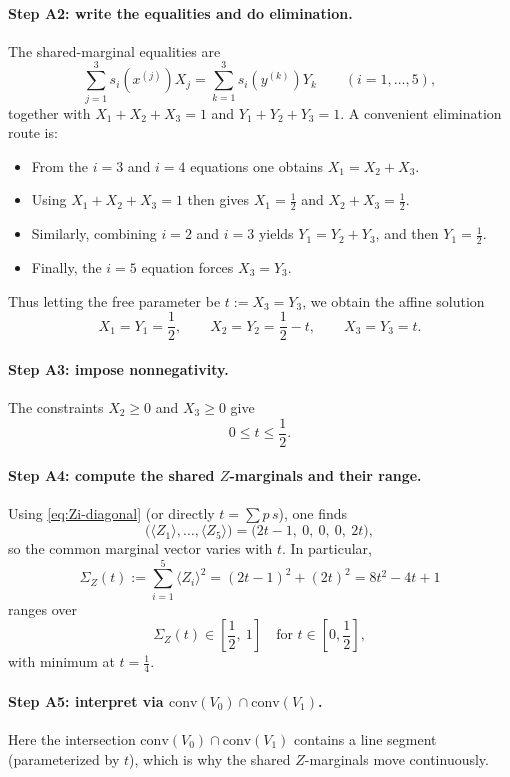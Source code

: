 \documentclass[11pt]{article}
\begin{document}
\paragraph{Step A2: write the equalities and do elimination.}
The shared-marginal equalities are
\[
\sum_{j=1}^3 s_i(x^{(j)})X_j=\sum_{k=1}^3 s_i(y^{(k)})Y_k\qquad (i=1,\dots,5),
\]
together with
\(
X_1+X_2+X_3=1
\) and
\(
Y_1+Y_2+Y_3=1.
\)
A convenient elimination route is:
\begin{itemize}
\item From the $i=3$ and $i=4$ equations one obtains $X_1=X_2+X_3$.
\item Using $X_1+X_2+X_3=1$ then gives $X_1=\tfrac12$ and $X_2+X_3=\tfrac12$.
\item Similarly, combining $i=2$ and $i=3$ yields $Y_1=Y_2+Y_3$, and then $Y_1=\tfrac12$.
\item Finally, the $i=5$ equation forces $X_3=Y_3$.
\end{itemize}
Thus letting the free parameter be
\(
 t:=X_3=Y_3
\), we obtain the affine solution
\[
X_1=Y_1=\frac12,\qquad X_2=Y_2=\frac12-t,\qquad X_3=Y_3=t.
\]

\paragraph{Step A3: impose nonnegativity.}
The constraints $X_2\ge 0$ and $X_3\ge 0$ give
\[
0\le t\le \frac12.
\]

\paragraph{Step A4: compute the shared $Z$-marginals and their range.}
Using \eqref{eq:Zi-diagonal} (or directly $t=\sum p\,s$), one finds
\[
\bigl(\langle Z_1\rangle,\dots,\langle Z_5\rangle\bigr)=\bigl(2t-1,\ 0,\ 0,\ 0,\ 2t\bigr),
\]
so the common marginal vector varies with $t$.
In particular,
\[
\Sigma_Z(t):=\sum_{i=1}^5\langle Z_i\rangle^2=(2t-1)^2+(2t)^2=8t^2-4t+1
\]
ranges over
\[
\Sigma_Z(t)\in\left[\frac12,\ 1\right]\quad\text{for }t\in\left[0,\frac12\right],
\]
with minimum at $t=\tfrac14$.

\paragraph{Step A5: interpret via $\mathrm{conv}(V_0)\cap\mathrm{conv}(V_1)$.}
Here the intersection $\mathrm{conv}(V_0)\cap\mathrm{conv}(V_1)$ contains a line segment (parameterized by $t$), which is why the shared $Z$-marginals move continuously.
\end{document}
